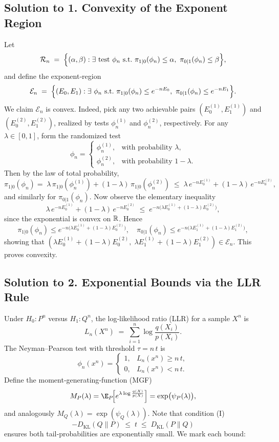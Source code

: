 \documentclass[11pt]{article}
\begin{document}
\subsection*{Solution to 1. Convexity of the Exponent Region}

Let
\[
\mathcal{R}_n \;=\;\Bigl\{(\alpha,\beta):\exists\ \text{test } \phi_n\ \text{s.t.}\ \pi_{1|0}(\phi_n)\le\alpha,\ \pi_{0|1}(\phi_n)\le\beta\Bigr\},
\]
and define the exponent‐region
\[
\mathcal{E}_n \;=\;\Bigl\{(E_0,E_1):\exists\ \phi_n\ \text{s.t.}\ \pi_{1|0}(\phi_n)\le e^{-nE_0},\ \pi_{0|1}(\phi_n)\le e^{-nE_1}\Bigr\}.
\]
We claim $\mathcal{E}_n$ is convex.  Indeed, pick any two achievable pairs $(E_0^{(1)},E_1^{(1)})$ and $(E_0^{(2)},E_1^{(2)})$, realized by tests $\phi_n^{(1)}$ and $\phi_n^{(2)}$, respectively.  For any $\lambda\in[0,1]$, form the randomized test
\[
\phi_n = \begin{cases}
\phi_n^{(1)},&\text{with probability }\lambda,\\
\phi_n^{(2)},&\text{with probability }1-\lambda.
\end{cases}
\]
Then by the law of total probability,
\[
\pi_{1|0}(\phi_n)
=\;\lambda\,\pi_{1|0}(\phi_n^{(1)})+(1-\lambda)\,\pi_{1|0}(\phi_n^{(2)})
\;\le\;
\lambda\,e^{-nE_0^{(1)}}+(1-\lambda)\,e^{-nE_0^{(2)}},
\]
and similarly for $\pi_{0|1}(\phi_n)$.  Now observe the elementary inequality
\[
\lambda\,e^{-nE_0^{(1)}}+(1-\lambda)\,e^{-nE_0^{(2)}}
\;\le\;
e^{-n\bigl(\lambda E_0^{(1)}+(1-\lambda)E_0^{(2)}\bigr)},
\]
since the exponential is convex on $\Bbb R$.  Hence
\[
\pi_{1|0}(\phi_n)\le e^{-n\bigl(\lambda E_0^{(1)}+(1-\lambda)E_0^{(2)}\bigr)},\quad
\pi_{0|1}(\phi_n)\le e^{-n\bigl(\lambda E_1^{(1)}+(1-\lambda)E_1^{(2)}\bigr)},
\]
showing that $(\lambda E_0^{(1)}+(1-\lambda)E_0^{(2)},\;\lambda E_1^{(1)}+(1-\lambda)E_1^{(2)})\in\mathcal{E}_n$.  This proves convexity.

\bigskip

\subsection*{Solution to 2. Exponential Bounds via the LLR Rule}

Under $H_0:P^n$ versus $H_1:Q^n$, the log‐likelihood ratio (LLR) for a sample $X^n$ is
\[
L_n(X^n)\;=\;\sum_{i=1}^n \log\frac{q(X_i)}{p(X_i)}.
\]
The Neyman–Pearson test with threshold $\tau = n\,t$ is
\[
\phi_n(x^n)
=\begin{cases}
1,&L_n(x^n)\ge n\,t,\\
0,&L_n(x^n)< n\,t.
\end{cases}
\]
Define the moment‐generating‐function (MGF)
\[
M_P(\lambda)=\E_{P}\!\Big[e^{\lambda\log\frac{q(X)}{p(X)}}\Big]
=\exp\bigl(\psi_P(\lambda)\bigr),
\]
and analogously $M_Q(\lambda)=\exp(\psi_Q(\lambda))$.  Note that condition (I)
\[
-D_{\mathrm{KL}}(Q\!\parallel\!P)\;\le\;t\;\le\;D_{\mathrm{KL}}(P\!\parallel\!Q)
\]
ensures both tail‐probabilities are exponentially small.  We mark each bound:
\end{document}
